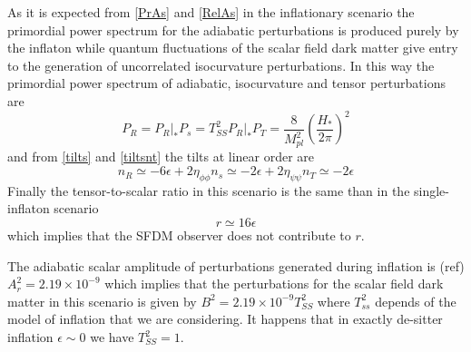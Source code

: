 \documentclass[twocolumn,           %
               showpacs,            %
               preprintnumbers,     %
               aps,                 %
               prl,          	    %
               letterpaper,             %
               superscriptaddress,      %
               nofootinbib,         %
               tightenlines,        %
               floats,floatfix      %
               ,usenatbib,
               ]{revtex4-1}
\begin{document}
As it  is expected from \eqref{PrAs} and \eqref{RelAs} in the inflationary scenario the primordial power spectrum for the adiabatic perturbations is produced purely by the inflaton while quantum fluctuations of the scalar field dark matter give entry to the generation of uncorrelated isocurvature perturbations. In this way the primordial power spectrum of adiabatic, isocurvature and tensor perturbations are
\begin{subequations}
\begin{equation}
P_R=P_R|_*
\end{equation}
\begin{equation}\label{PS1}
P_s=T_{SS}^2 P_R|_*
\end{equation}
\begin{equation}
P_T=\frac{8}{M_{pl}^2}\left(\frac{H_*}{2\pi}\right)^2
\end{equation}
\end{subequations}
and from \eqref{tilts} and \eqref{tiltsnt} the tilts at linear order are
\begin{subequations}
\begin{equation}
n_R\simeq-6\epsilon+2\eta_{\phi\phi}
\end{equation}
\begin{equation}
n_s\simeq-2\epsilon+2\eta_{\psi\psi}
\end{equation}
\begin{equation}
n_T\simeq -2\epsilon
\end{equation}
\end{subequations}
Finally the tensor-to-scalar ratio in this scenario is the same than in the single-inflaton scenario
\begin{equation}
r\simeq 16\epsilon
\end{equation}
which implies that the SFDM observer does not contribute to $r$.

The adiabatic scalar amplitude of perturbations generated during inflation is (ref) 
$A_r^2=2.19\times 10^{-9}
$ which implies that the perturbations for the scalar field dark matter in this scenario is given by $B^2=2.19\times 10^{-9}T_{SS}^2$ where $T_{ss}^2$ depends of the model of inflation that we are considering. It happens that in exactly de-sitter inflation $\epsilon\sim 0$ we have $T_{SS}^2=1$. 
\end{document}
